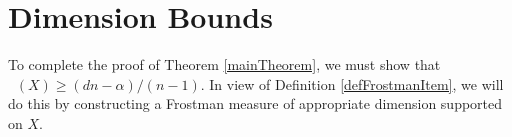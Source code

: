 \documentclass[dvipsnames,letterpaper,12pt]{article}
\numberwithin{equation}{section}
\theoremstyle{plain}
\theoremstyle{remark}
\DeclareMathOperator{\hausdim}{\dim_{\mathbf{H}}}
\DeclareMathOperator{\B}{\mathcal{B}}
\begin{document}
\section{Dimension Bounds}\label{dimensionsection}

To complete the proof of Theorem \ref{mainTheorem}, we must show that $\hausdim(X) \geq (dn - \alpha)/(n - 1)$.  %
%
In view of Definition \ref{defFrostmanItem}, we will do this by constructing a Frostman measure of appropriate dimension supported on $X$. 
%
%
\end{document}
